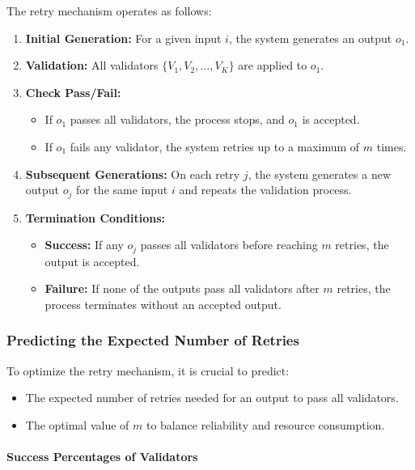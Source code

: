 \documentclass{article}
\begin{document}
The retry mechanism operates as follows:

\begin{enumerate}
    \item \textbf{Initial Generation:} For a given input \( i \), the system generates an output \( o_1 \).
    \item \textbf{Validation:} All validators \( \{V_1, V_2, \ldots, V_K\} \) are applied to \( o_1 \).
    \item \textbf{Check Pass/Fail:}
    \begin{itemize}
        \item If \( o_1 \) passes all validators, the process stops, and \( o_1 \) is accepted.
        \item If \( o_1 \) fails any validator, the system retries up to a maximum of \( m \) times.
    \end{itemize}
    \item \textbf{Subsequent Generations:} On each retry \( j \), the system generates a new output \( o_j \) for the same input \( i \) and repeats the validation process.
    \item \textbf{Termination Conditions:}
    \begin{itemize}
        \item \textbf{Success:} If any \( o_j \) passes all validators before reaching \( m \) retries, the output is accepted.
        \item \textbf{Failure:} If none of the outputs pass all validators after \( m \) retries, the process terminates without an accepted output.
    \end{itemize}
\end{enumerate}

\subsubsection{Predicting the Expected Number of Retries}

To optimize the retry mechanism, it is crucial to predict:

\begin{itemize}
    \item The expected number of retries needed for an output to pass all validators.
    \item The optimal value of \( m \) to balance reliability and resource consumption.
\end{itemize}

\paragraph{Success Percentages of Validators}
\end{document}
